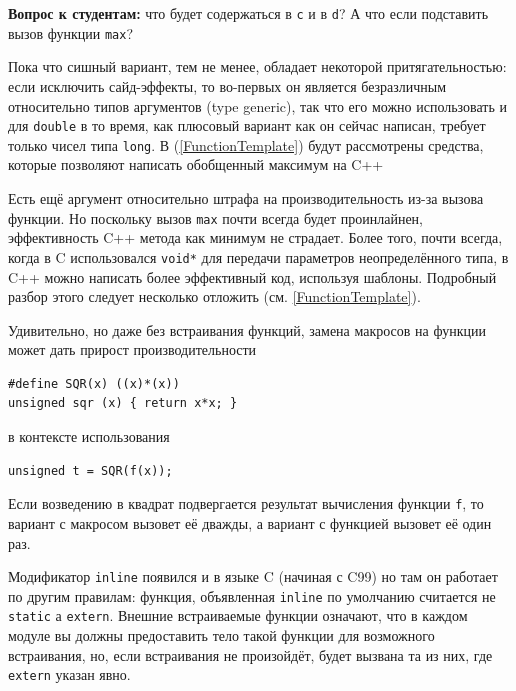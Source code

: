 \documentclass[a4paper,12pt,oneside]{article}
\newif\ifanswers
\begin{document}
\textbf{Вопрос к студентам:} что будет содержаться в \lstinline!c! и в \lstinline!d!? А что если подставить вызов функции \lstinline!max!? 

\ifanswers
Правильный ответ: макрос раскроется как \lstinline!((++a) > (b) ? (++a) : (b))! то есть в сишной версии \lstinline!a! будет инкрементирована дважды. В С++ версии всё норм.
\fi

Пока что сишный вариант, тем не менее, обладает некоторой притягательностью: если исключить сайд-эффекты, то во-первых он является безразличным относительно типов аргументов (type generic), так что его можно использовать и для \lstinline!double! в то время, как плюсовый вариант как он сейчас написан, требует только чисел типа \lstinline!long!. В (\ref{FunctionTemplate}) будут рассмотрены средства, которые позволяют написать обобщенный максимум на C++

Есть ещё аргумент относительно штрафа на производительность из-за вызова функции. Но поскольку вызов \lstinline!max! почти всегда будет проинлайнен, эффективность C++ метода как минимум не страдает. Более того, почти всегда, когда в C использовался \lstinline!void*! для передачи параметров неопределённого типа, в C++ можно написать более эффективный код, используя шаблоны. Подробный разбор этого следует несколько отложить (см. \ref{FunctionTemplate}).

Удивительно, но даже без встраивания функций, замена макросов на функции может дать прирост производительности

\begin{lstlisting}
#define SQR(x) ((x)*(x))
unsigned sqr (x) { return x*x; }
\end{lstlisting}

в контексте использования

\begin{lstlisting}
unsigned t = SQR(f(x));
\end{lstlisting}

Если возведению в квадрат подвергается результат вычисления функции \lstinline!f!, то вариант с макросом вызовет её дважды, а вариант с функцией вызовет её один раз.

Модификатор \lstinline!inline! появился и в языке C (начиная с C99) но там он работает по другим правилам: функция, объявленная \lstinline!inline! по умолчанию считается не \lstinline!static! а \lstinline!extern!. Внешние встраиваемые функции означают, что в каждом модуле вы должны предоставить тело такой функции для возможного встраивания, но, если встраивания не произойдёт, будет вызвана та из них, где \lstinline!extern! указан явно.
\end{document}
